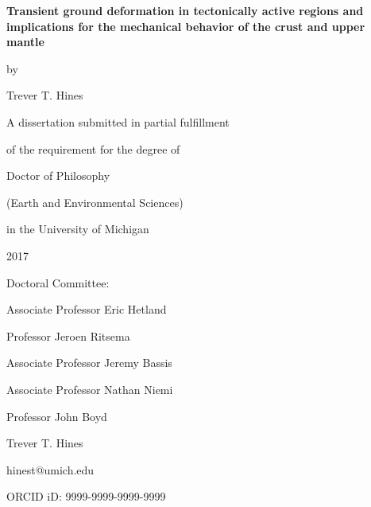 \documentclass[letterpaper,12pt,oneside]{book}
\begin{document}
\frontmatter %

\thispagestyle{empty} %
\begin{center}
\vspace*{1.0in}
\textbf{\large{Transient ground deformation in tectonically active regions and implications for the mechanical behavior of the crust and upper mantle}}

\vspace*{0.2in}
by

\vspace*{0.2in}
Trever T. Hines 

\vspace*{1.0in}
A dissertation submitted in partial fulfillment

of the requirement for the degree of 

Doctor of Philosophy

(Earth and Environmental Sciences)

in the University of Michigan

2017
\end{center}
\vspace*{1.0in}
Doctoral Committee:

\vspace*{0.1in}
\hspace*{0.2in}
Associate Professor Eric Hetland

\hspace*{0.2in}
Professor Jeroen Ritsema

\hspace*{0.2in}
Associate Professor Jeremy Bassis

\hspace*{0.2in}
Associate Professor Nathan Niemi

\hspace*{0.2in}
Professor John Boyd

\newpage

\thispagestyle{empty} %
\begin{center}
\vspace*{1.0in}
Trever T. Hines

hinest@umich.edu

ORCID iD: 9999-9999-9999-9999
\end{center}
\newpage
\end{document}

